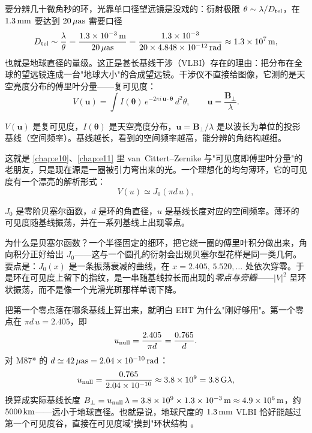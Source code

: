 要分辨几十微角秒的环，光靠单口径望远镜是没戏的：衍射极限 \(\theta\sim\lambda/D_{\rm tel}\)，在 \(1.3\,{\rm mm}\) 要达到 \(20\,\mu{\rm as}\) 需要口径
\[
  D_{\rm tel}\sim\frac{\lambda}{\theta}
  =\frac{1.3\times10^{-3}\,{\rm m}}{20\,\mu{\rm as}}
  =\frac{1.3\times10^{-3}}{20\times4.848\times10^{-12}\,{\rm rad}}
  \approx1.3\times10^{7}\,{\rm m},
\]
也就是地球直径的量级。这正是甚长基线干涉（VLBI）存在的理由：把分布在全球的望远镜连成一台"地球大小"的合成望远镜。干涉仪不直接给图像，它测的是天空亮度分布的傅里叶分量——复可见度：
\begin{equation}
  V(\bm{u})=\int I(\bm{\theta})\,
  e^{-2\pi i\,\bm{u}\cdot\bm{\theta}}\,d^2\theta,
  \qquad
  \bm{u}=\frac{\bm{B}_\perp}{\lambda}.
  \label{eq:e19-vis}
\end{equation}
\begin{formulaexplain}
\(V(\bm u)\) 是复可见度，\(I(\bm\theta)\) 是天空亮度分布，\(\bm u=\bm B_\perp/\lambda\) 是以波长为单位的投影基线（空间频率）。基线越长，看到的空间频率越高，能分辨的角结构越细。
\end{formulaexplain}
这就是 \ref{chap:e10}、\ref{chap:e11} 里 van~Cittert--Zernike 与"可见度即傅里叶分量"的老朋友，只是现在源是一圈被引力弯出来的光。一个理想化的均匀薄环，它的可见度有一个漂亮的解析形式：
\begin{equation}
  V(u)\simeq J_0(\pi d\,u),
  \label{eq:e19-bessel}
\end{equation}
\begin{formulaexplain}
\(J_0\) 是零阶贝塞尔函数，\(d\) 是环的角直径，\(u\) 是基线长度对应的空间频率。薄环的可见度随基线振荡，并在一系列基线上出现零点。
\end{formulaexplain}
为什么是贝塞尔函数？一个半径固定的细环，把它绕一圈的傅里叶积分做出来，角向积分正好给出 \(J_0\)——这与一个圆孔的衍射会出现贝塞尔型花样是同一类几何。要点是：\(J_0(x)\) 是一条振荡衰减的曲线，在 \(x=2.405,\,5.520,\dots\) 处依次穿零。于是环在可见度上留下的指纹，是一串随基线拉长而出现的\emph{零点与旁瓣}——\(|V|^2\) 呈环状振荡，而不是像一个光滑光斑那样单调下降。

把第一个零点落在哪条基线上算出来，就明白 EHT 为什么"刚好够用"。第一个零点在 \(\pi d\,u=2.405\)，即
\[
  u_{\rm null}=\frac{2.405}{\pi d}=\frac{0.765}{d}.
\]
对 M87* 的 \(d\simeq42\,\mu{\rm as}=2.04\times10^{-10}\,{\rm rad}\)：
\[
  u_{\rm null}=\frac{0.765}{2.04\times10^{-10}}\approx3.8\times10^{9}
  =3.8\,{\rm G}\lambda,
\]
换算成实际基线长度 \(B_\perp=u_{\rm null}\,\lambda=3.8\times10^9\times1.3\times10^{-3}\,{\rm m}\approx4.9\times10^{6}\,{\rm m}\)，约 \(5000\,{\rm km}\)——远小于地球直径。也就是说，地球尺度的 \(1.3\,{\rm mm}\) VLBI 恰好能越过第一个可见度谷，直接在可见度域"摸到"环状结构 \citep{2019ApJ...875L...2E,2019ApJ...875L...3E,2020SciA....6.1310J}。

